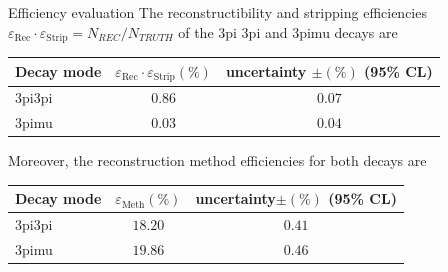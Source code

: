 \documentclass[9pt,usenames,dvipsnames]{beamer}
\begin{document}
\begin{frame}{Efficiency evaluation}
	The reconstructibility and stripping efficiencies $\varepsilon_{\text{Rec}}\cdot\varepsilon_{\text{Strip}}= N_{REC}/N_{TRUTH}$  of the 3pi 3pi and 3pimu decays are
	\begin{table}[!htbp]	
		\centering
		\begin{tabular}{l  c c }
			\hline
			Decay mode & $\varepsilon_{\text{Rec}}\cdot \varepsilon_{\text{Strip}} (\%)$ & uncertainty $\pm (\%)$  (95\% CL)\\
			\hline
			3pi3pi & $0.86$ & $ 0.07$ \\
			3pimu & $ 0.03$& $ 0.04$ \\
			\hline
		\end{tabular}
		\label{eta_rec}
	\end{table}
	Moreover, the reconstruction method efficiencies for both decays are
	\begin{table}
		\label{eta_meth}
		\centering
		\begin{tabular}{l  c c }
			\hline
			Decay mode & $\varepsilon_{\text{Meth}} (\%)$ &  uncertainty$\pm (\%)$ (95\% CL)\\
			\hline
			3pi3pi & $18.20$ & $ 0.41$ \\
			3pimu & $ 19.86$& $ 0.46$ \\
			\hline
		\end{tabular}
	\end{table}
\end{frame}
\end{document}
